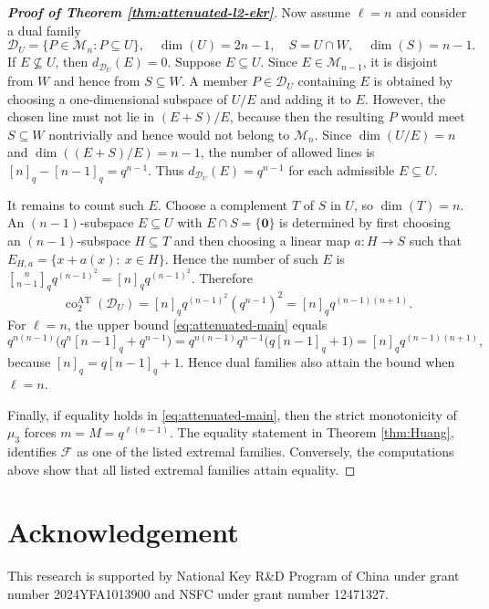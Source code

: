 \documentclass[11pt]{article}
\theoremstyle{definition}
\newcommand{\qbinom}[2]{\genfrac{[}{]}{0pt}{}{#1}{#2}_q}
\begin{document}
\begin{proof}[\bfseries{Proof of Theorem \ref{thm:attenuated-l2-ekr}}]
Now assume $\ell=n$ and consider a dual family
\[
\mathcal D_U=\{P\in\mathcal M_n:P\subseteq U\},
\quad
\dim (U)=2n-1,
\quad
S=U\cap W,
\quad
\dim (S)=n-1.
\]
If $E\not\subseteq U$, then $d_{\mathcal D_U}(E)=0$. Suppose $E\subseteq U$.  Since $E\in\mathcal M_{n-1}$, it is disjoint from $W$ and hence from $S\subseteq W$.  A member $P\in\mathcal D_U$ containing $E$ is obtained by choosing a one-dimensional subspace of $U/E$ and adding it to $E$.  However, the chosen line must not lie in $(E+S)/E$, because then the resulting $P$ would meet $S\subseteq W$ nontrivially and hence would not belong to $\mathcal M_n$.  Since $\dim(U/E)=n$ and $\dim((E+S)/E)=n-1$, the number of allowed lines is $[n]_q-[n-1]_q=q^{n-1}$. Thus $d_{\mathcal D_U}(E)=q^{n-1}$ for each admissible $E\subseteq U$.

It remains to count such $E$.  Choose a complement $T$ of $S$ in $U$, so $\dim (T)=n$.  An $(n-1)$-subspace $E\subseteq U$ with $E\cap S=\{\bm{0}\}$ is determined by first choosing an $(n-1)$-subspace $H\subseteq T$ and then choosing a linear map $a:H\to S$ such that $E_{H,a}=\{x+a(x):\ x\in H\}$.  Hence the number of such $E$ is $\qbinom{n}{n-1}q^{(n-1)^2}=[n]_q q^{(n-1)^2}$.
Therefore
\[
\operatorname{co}^{\mathrm{AT}}_2(\mathcal D_U)
=[n]_q q^{(n-1)^2}(q^{n-1})^2
=[n]_q q^{(n-1)(n+1)}.
\]
For $\ell=n$, the upper bound \eqref{eq:attenuated-main} equals
\[
q^{n(n-1)}\bigl(q^n[n-1]_q+q^{n-1}\bigr)
=q^{n(n-1)}q^{n-1}\bigl(q[n-1]_q+1\bigr)
=[n]_q q^{(n-1)(n+1)},
\]
because $[n]_q=q[n-1]_q+1$.  Hence dual families also attain the bound when $\ell=n$.

Finally, if equality holds in \eqref{eq:attenuated-main}, then the strict monotonicity of $\mu_3$ forces $m=M=q^{\ell(n-1)}$.  The equality statement in  Theorem \ref{thm:Huang}, identifies $\mathcal F$ as one of the listed extremal families.  Conversely, the computations above show that all listed extremal families attain equality.
\end{proof}

\section*{Acknowledgement}
\noindent This research is supported by National Key R\&D Program of China under grant number 2024YFA1013900 and NSFC under grant number 12471327. 
\end{document}
